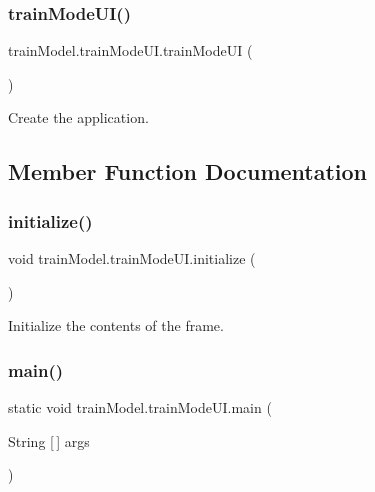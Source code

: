\subsubsection{\texorpdfstring{train\+Mode\+U\+I()}{trainModeUI()}}
{\footnotesize\ttfamily train\+Model.\+train\+Mode\+U\+I.\+train\+Mode\+UI (\begin{DoxyParamCaption}{ }\end{DoxyParamCaption})}



Create the application. 



\subsection{Member Function Documentation}
\mbox{\label{classtrainModel_1_1trainModeUI_a16cac97f7a09b9f1fbe5bf6a9c6909e8}} 
\subsubsection{\texorpdfstring{initialize()}{initialize()}}
{\footnotesize\ttfamily void train\+Model.\+train\+Mode\+U\+I.\+initialize (\begin{DoxyParamCaption}{ }\end{DoxyParamCaption})\hspace{0.3cm}{\ttfamily [private]}}



Initialize the contents of the frame. 

\mbox{\label{classtrainModel_1_1trainModeUI_a450d0a951e51bfe7f706c34275ba3e68}} 
\subsubsection{\texorpdfstring{main()}{main()}}
{\footnotesize\ttfamily static void train\+Model.\+train\+Mode\+U\+I.\+main (\begin{DoxyParamCaption}\item[{String \mbox{[}$\,$\mbox{]}}]{args }\end{DoxyParamCaption})\hspace{0.3cm}{\ttfamily [static]}}

